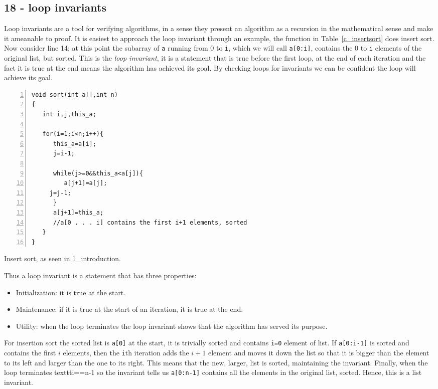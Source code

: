 \documentclass[11pt,a4paper]{scrartcl}
\begin{document}
\subsection*{18 - loop invariants}

Loop invariants are a tool for verifying algorithms, in a sense they
present an algorithm as a recursion in the mathematical sense and make
it ameanable to proof. It is easiest to approach the loop invariant
through an example, the function in Table~\ref{c_insertsort} does
insert sort. Now consider line 14; at this point the subarray of
\texttt{a} running from 0 to \texttt{i}, which we will call
\texttt{a[0:i]}, contains the 0 to \texttt{i} elements of the original
list, but sorted. This is the \textsl{loop invariant}, it is a
statement that is true before the first loop, at the end of each
iteration and the fact it is true at the end means the algorithm has
achieved its goal. By checking loops for invariants we can be
confident the loop will achieve its goal.

\begin{table}
\begin{lstlisting}[numbers=left]
void sort(int a[],int n)
{
   int i,j,this_a;

   for(i=1;i<n;i++){
      this_a=a[i];
      j=i-1;

      while(j>=0&&this_a<a[j]){
         a[j+1]=a[j];
	 j=j-1;
      }
      a[j+1]=this_a;
      //a[0 . . . i] contains the first i+1 elements, sorted
   }
}
\end{lstlisting}
\caption{Insert sort, as seen in 1\_introduction.\label{c_insertsort}}
\end{table}

Thus a loop invariant is a statement that has three properties:
\begin{itemize}
\item Initialization: it is true at the start.
\item Maintenance: if it is true at the start of an iteration, it is
  true at the end.
\item Utility: when the loop terminates the loop invariant shows that
  the algorithm has served its purpose.
\end{itemize}
For insertion sort the sorted list is \texttt{a[0]} at the start, it
is trivially sorted and contains \texttt{i=0} element of list. If
\texttt{a[0:i-1]} is sorted and contains the first $i$ elements, then
the \texttt{i}th iteration adds the $i+1$ element and moves it down
the list so that it is bigger than the element to its left and larger
than the one to its right. This means that the new, larger, list is
sorted, maintaining the invariant. Finally, when the loop terminates
texttt{i==n-1} so the invariant tells us \texttt{a[0:n-1]} contains
all the elements in the original list, sorted. Hence, this is a list
invariant.
\end{document}
